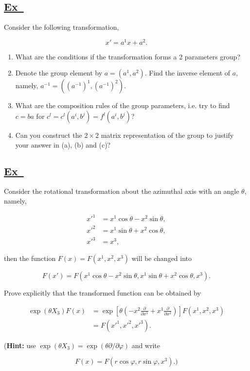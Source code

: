 \documentclass[a4paper,12pt]{article}
\newcommand{\excercise}{\addtocounter{section}{+1}
\subsection*{\underline{Ex~\thesection}}}
\begin{document}
\excercise

Consider the following transformation,

$$
x'=a^1x+a^2.
$$

\begin{enumerate}
\item What are the conditions if the transformation forms a 2 parameters group?
\item Denote the group element by $ a=(a^1,a^2) $. Find the inverse element of $ a $, namely, $ a^{-1}=((a^{-1})^1,(a^{-1})^2) $.
\item What are the composition rules of the group parameters, i.e. try to find $ c=ba $ for $ c^l=c^l(a^i,b^j)=f^l(a^i,b^j) $?
\item Can you construct the $ 2\times 2 $ matrix representation of the group to justify
your answer in (a), (b) and (c)?
\end{enumerate}

\excercise

Consider the rotational transformation about the azimuthal axis with an angle $ \theta $, namely,

\begin{align*}
x'^1&=x^1\cos\theta-x^2\sin\theta,\\
x'^2&=x^1\sin\theta+x^2\cos\theta,\\
x'^3&=x^3,
\end{align*}

\noindent then the function $ F(x)=F(x^1,x^2,x^3) $ will be changed into 

$$
F(x')=F(x^1\cos\theta-x^2\sin\theta,x^1\sin\theta+x^2\cos\theta,x^3).
$$

Prove explicitly that the transformed function can be obtained by

\begin{align*}
\exp(\theta X_3)F(x)&=\exp\left[\theta\left(-x^2\frac{\partial}{\partial x^1}+x^1\frac{\partial}{\partial x^2}\right)\right]F(x^1,x^2,x^3)\\
&=F(x'^1,x'^2,x'^3).
\end{align*}

(\textbf{Hint:} use $ \exp(\theta X_3)=\exp\left(\theta\partial/\partial\varphi\right) $ and write 

$$
F(x) = F(r\cos\varphi,r\sin\varphi, x^3).)
$$
\end{document}
